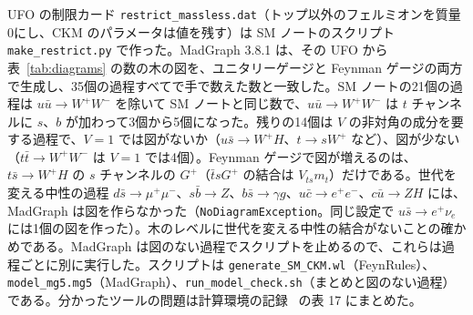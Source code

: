 \documentclass[a4paper,10pt]{ltjsarticle}
\begin{document}
UFO の制限カード \texttt{restrict\_massless.dat}（トップ以外のフェルミオンを質量0にし、CKM のパラメータは値を残す）は SM ノートのスクリプト \texttt{make\_restrict.py} で作った。MadGraph 3.8.1 は、その UFO から表~\ref{tab:diagrams} の数の木の図を、ユニタリーゲージと Feynman ゲージの両方で生成し、35個の過程すべてで手で数えた数と一致した。SM ノートの21個の過程は $u\bar u\to W^+W^-$ を除いて SM ノートと同じ数で、$u\bar u\to W^+W^-$ は $t$ チャンネルに $s$、$b$ が加わって3個から5個になった。残りの14個は $V$ の非対角の成分を要する過程で、$V=1$ では図がないか（$u\bar s\to W^+H$、$t\to sW^+$ など）、図が少ない（$t\bar t\to W^+W^-$ は $V=1$ では4個）。Feynman ゲージで図が増えるのは、$t\bar s\to W^+H$ の $s$ チャンネルの $G^+$（$\bar t sG^+$ の結合は $V_{ts}m_t$）だけである。世代を変える中性の過程 $d\bar s\to\mu^+\mu^-$、$s\bar b\to Z$、$b\bar s\to\gamma g$、$u\bar c\to e^+e^-$、$c\bar u\to ZH$ には、MadGraph は図を作らなかった（\texttt{NoDiagramException}。同じ設定で $u\bar s\to e^+\nu_e$ には1個の図を作った）。木のレベルに世代を変える中性の結合がないことの確かめである。MadGraph は図のない過程でスクリプトを止めるので、これらは過程ごとに別に実行した。スクリプトは \texttt{generate\_SM\_CKM.wl}（FeynRules）、\texttt{model\_mg5.mg5}（MadGraph）、\texttt{run\_model\_check.sh}（まとめと図のない過程）である。分かったツールの問題は計算環境の記録~\cite{env} の表 17 にまとめた。
\end{document}
